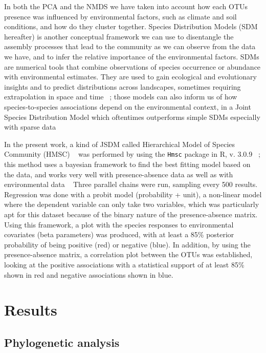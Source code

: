 In both the PCA and the NMDS we have taken into account how each OTUs presence was influenced by environmental factors, such as climate and soil conditions, and how do they cluster together.
Species Distribution Models (SDM hereafter) is another conceptual framework we can use to disentangle the assembly processes that lead to the community as we can observe from the data we have, and to infer the relative importance of the environmental factors. SDMs are numerical tools that combine observations of species occurrence or abundance with environmental estimates. They are used to gain ecological and evolutionary insights and to predict distributions across landscapes, sometimes requiring extrapolation in space and time ~\citep{elith2009}; those models can also inform us of how species‐to‐species associations depend on the environmental context, in a Joint Species Distribution Model which oftentimes outperforms simple SDMs especially with sparse data ~\citep{pollock2014, tikhonov2017}

In the present work, a kind of JSDM called Hierarchical Model of Species Community (HMSC) ~\citep{ovaskainen2017} was performed by using the \texttt{Hmsc} package in R, v. 3.0.9 ~\citep{tikhonov2020, hmsc-r2021}; this method uses a bayesian framework to find the best fitting model based on the data, and works very well with presence-absence data as well as with environmental data ~\citep{hefley2016}
Three parallel chains were run, sampling every 500 results. Regression was done with a probit model (probability + unit), a non-linear model where the dependent variable can only take two variables, which was particularly apt for this dataset because of the binary nature of the presence-absence matrix.
Using this framework, a plot with the species responses to environmental covariates (beta parameters) was produced, with at least a 85\% posterior probability of being positive (red) or negative (blue).
In addition, by using the presence-absence matrix, a correlation plot between the OTUs was established, looking at the positive associations with a statistical support of at least 85\% shown in red and negative associations shown in blue.

\part{Results}
\label{results}

\chapter{Phylogenetic analysis}
\label{phylogeneticanalysis}

